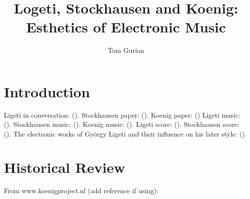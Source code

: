 \documentclass[a4paper,11pt]{article}
\title{Logeti, Stockhausen and Koenig:\\Esthetics of Electronic Music}
\author{Tom Gurion}
\begin{document}
\maketitle
\tableofcontents

\section{Introduction}
\label{sec:introduction}

Ligeti in conversation: (\cite{varnai}).
Stockhausen paper: (\cite{stockhausen}).
Koenig paper: (\cite{koenig})
Ligeti music: (\cite{rami_music}).
Stockhausen music: (\cite{gesang_music}).
Koenig music: (\cite{todo_music}).
Ligeti score: (\cite{rami}).
Stockhausen score: (\cite{gesang}).
The electronic works of Gy{\"o}rgy Ligeti and their influence on his later style: (\cite{levy2006}).

\section{Historical Review}
\label{sec:historical_Review}

From www.koenigproject.nl (add reference if using):
\end{document}
